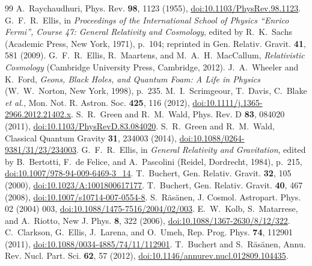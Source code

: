 \documentclass[aps,prd,reprint,amsmath,amssymb,superscriptaddress]{revtex4-2}
\begin{document}
\begin{thebibliography}{99}
 A.~Raychaudhuri, Phys. Rev. \textbf{98}, 1123 (1955), \href{https://doi.org/10.1103/PhysRev.98.1123}{doi:10.1103/PhysRev.98.1123}.
 G.~F.~R.~Ellis, in \textit{Proceedings of the International School of Physics ``Enrico Fermi'', Course 47: General Relativity and Cosmology}, edited by R.~K.~Sachs (Academic Press, New York, 1971), p.~104; reprinted in Gen. Relativ. Gravit. \textbf{41}, 581 (2009).
 G.~F.~R.~Ellis, R.~Maartens, and M.~A.~H.~MacCallum, \textit{Relativistic Cosmology} (Cambridge University Press, Cambridge, 2012).
 J.~A.~Wheeler and K.~Ford, \textit{Geons, Black Holes, and Quantum Foam: A Life in Physics} (W.~W.~Norton, New York, 1998), p.~235.
 M.~I.~Scrimgeour, T.~Davis, C.~Blake \textit{et al.}, Mon. Not. R. Astron. Soc. \textbf{425}, 116 (2012), \href{https://doi.org/10.1111/j.1365-2966.2012.21402.x}{doi:10.1111/j.1365-2966.2012.21402.x}.
 S.~R.~Green and R.~M.~Wald, Phys. Rev. D \textbf{83}, 084020 (2011), \href{https://doi.org/10.1103/PhysRevD.83.084020}{doi:10.1103/PhysRevD.83.084020}.
 S.~R.~Green and R.~M.~Wald, Classical Quantum Gravity \textbf{31}, 234003 (2014), \href{https://doi.org/10.1088/0264-9381/31/23/234003}{doi:10.1088/0264-9381/31/23/234003}.
 G.~F.~R.~Ellis, in \textit{General Relativity and Gravitation}, edited by B.~Bertotti, F.~de Felice, and A.~Pascolini (Reidel, Dordrecht, 1984), p.~215, \href{https://doi.org/10.1007/978-94-009-6469-3_14}{doi:10.1007/978-94-009-6469-3_14}.
 T.~Buchert, Gen. Relativ. Gravit. \textbf{32}, 105 (2000), \href{https://doi.org/10.1023/A:1001800617177}{doi:10.1023/A:1001800617177}.
 T.~Buchert, Gen. Relativ. Gravit. \textbf{40}, 467 (2008), \href{https://doi.org/10.1007/s10714-007-0554-8}{doi:10.1007/s10714-007-0554-8}.
 S.~R{\"a}s{\"a}nen, J. Cosmol. Astropart. Phys. 02 (2004) 003, \href{https://doi.org/10.1088/1475-7516/2004/02/003}{doi:10.1088/1475-7516/2004/02/003}.
 E.~W.~Kolb, S.~Matarrese, and A.~Riotto, New J. Phys. \textbf{8}, 322 (2006), \href{https://doi.org/10.1088/1367-2630/8/12/322}{doi:10.1088/1367-2630/8/12/322}.
 C.~Clarkson, G.~Ellis, J.~Larena, and O.~Umeh, Rep. Prog. Phys. \textbf{74}, 112901 (2011), \href{https://doi.org/10.1088/0034-4885/74/11/112901}{doi:10.1088/0034-4885/74/11/112901}.
 T.~Buchert and S.~R{\"a}s{\"a}nen, Annu. Rev. Nucl. Part. Sci. \textbf{62}, 57 (2012), \href{https://doi.org/10.1146/annurev.nucl.012809.104435}{doi:10.1146/annurev.nucl.012809.104435}.

\end{thebibliography}
\end{document}
